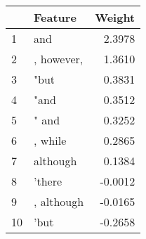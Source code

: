 \begin{tabular}{llr}
\toprule
{} &     Feature &  Weight \\
\midrule
1  &         and &  2.3978 \\
2  &  , however, &  1.3610 \\
3  &        "but &  0.3831 \\
4  &        "and &  0.3512 \\
5  &       " and &  0.3252 \\
6  &     , while &  0.2865 \\
7  &    although &  0.1384 \\
8  &      'there & -0.0012 \\
9  &  , although & -0.0165 \\
10 &        'but & -0.2658 \\
\bottomrule
\end{tabular}
